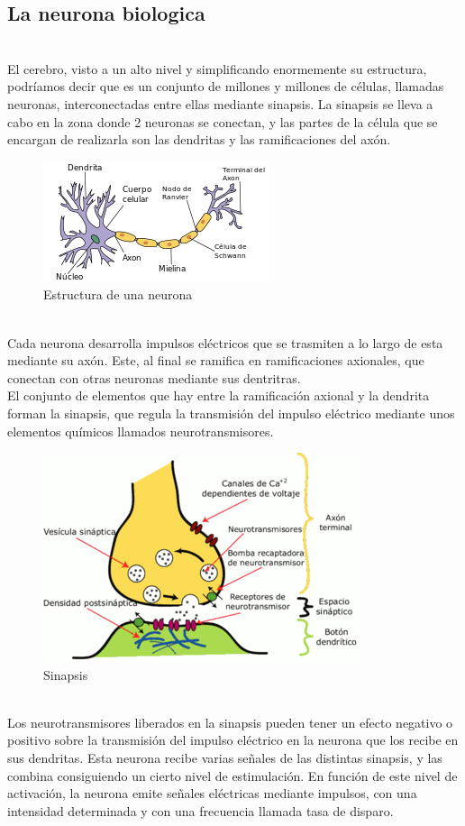 \subsection {La neurona biologica} \mbox{}\\
El cerebro, visto a un alto nivel y simplificando enormemente su estructura, podríamos decir que es un conjunto de millones y millones de células, llamadas neuronas, interconectadas entre ellas mediante sinapsis. La sinapsis se lleva a cabo en la zona donde 2 neuronas se conectan, y las partes de la célula que se encargan de realizarla son las dendritas y las ramificaciones del axón.
\begin{figure}[htp]
\centering
\includegraphics[scale=1]{images/neurona.png}
\caption{Estructura de una neurona}
\end{figure}\\
Cada neurona desarrolla impulsos eléctricos que se trasmiten a lo largo de esta mediante su axón. Este, al final se ramifica en ramificaciones axionales, que conectan con otras neuronas mediante sus dentritras.\\
El conjunto de elementos que hay entre la ramificación axional y la dendrita forman la sinapsis, que regula la transmisión del impulso eléctrico mediante unos elementos químicos llamados neurotransmisores.
\begin{figure}[htp]
\centering
\includegraphics[scale=0.70]{images/sinapsis.png}
\caption{Sinapsis}
\end{figure}\\
Los neurotransmisores liberados en la sinapsis pueden tener un efecto negativo o positivo sobre la transmisión del impulso eléctrico en la neurona que los recibe en sus dendritas. Esta neurona recibe varias señales de las distintas sinapsis, y las combina consiguiendo un cierto nivel de estimulación. En función de este nivel de activación, la neurona emite señales eléctricas mediante impulsos, con una intensidad determinada y con una frecuencia llamada tasa de disparo.\\
